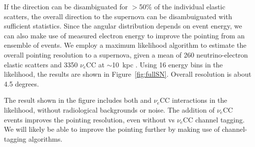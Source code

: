 If the direction can be disambiguated for $>$50\% of the individual elastic
scatters, the overall direction to the supernova can be disambuiguated
with sufficient statistics.  Since the angular
distribution depends on event energy, we can also make use of measured
electron energy to improve the pointing from an ensemble of events.
We employ a maximum likelihood algorithm to estimate the overall
pointing resolution to a supernova, given a mean of 260
neutrino-electron elastic scatters and 3350 $\nu_e$CC at $\sim$10~kpc .
Using 16 energy bins
in the likelihood, the results are shown in
Figure~\ref{fig:fullSN}.  Overall resolution is about 4.5 degrees.

The result shown in the figure includes both  and $\nu_e$CC interactions in the
likelihood, without radiological backgrounds or noise.
The addition of $\nu_e$CC events improves the
pointing resolution, even without  vs $\nu_e$CC channel tagging.
We will likely be able to improve the pointing further by making use of
channel-tagging algorithms.





